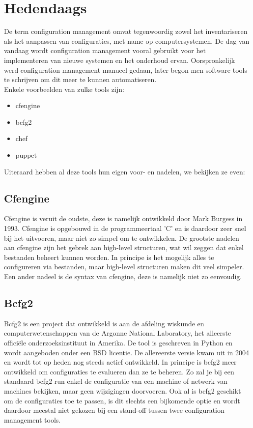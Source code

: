 \section{Hedendaags}
De term configuration management omvat tegenwoordig zowel het inventariseren als het aanpassen van configuraties, met name op computersystemen. De dag van vandaag wordt configuration management vooral gebruikt voor het implementeren van nieuwe systemen en het onderhoud ervan. Oorspronkelijk werd configuration management manueel gedaan, later begon men software tools te schrijven om dit meer te kunnen automatiseren.\\
Enkele voorbeelden van zulke tools zijn:
\begin{itemize}
\item cfengine
\item bcfg2
\item chef
\item puppet
\end{itemize}
Uiteraard hebben al deze tools hun eigen voor- en nadelen, we bekijken ze even:
%
\subsection{Cfengine}
Cfengine is veruit de oudste, deze is namelijk ontwikkeld door Mark Burgess in 1993. Cfengine is opgebouwd in de programmeertaal 'C' en is daardoor zeer snel bij het uitvoeren, maar niet zo simpel om te ontwikkelen. De grootste nadelen aan cfengine zijn het gebrek aan high-level structuren, wat wil zeggen dat enkel bestanden beheert kunnen worden. In principe is het mogelijk alles te configureren via bestanden, maar high-level structuren maken dit veel simpeler. Een ander nadeel is de syntax van cfengine, deze is namelijk niet zo eenvoudig.
%
\subsection{Bcfg2}
Bcfg2 is een project dat ontwikkeld is aan de afdeling wiskunde en computerwetenschappen van de Argonne National Laboratory, het alleerste offici\"ele onderzoeksinstituut in Amerika. De tool is geschreven in Python en wordt aangeboden onder een BSD licentie. De allereerste versie kwam uit in 2004 en wordt tot op heden nog steeds actief ontwikkeld. In principe is bcfg2 meer ontwikkeld om configuraties te evalueren dan ze te beheren. Zo zal je bij een standaard bcfg2 run enkel de configuratie van een machine of netwerk van machines bekijken, maar geen wijzigingen doorvoeren. Ook al is bcfg2 geschikt om de configuraties toe te passen, is dit slechts een bijkomende optie en wordt daardoor meestal niet gekozen bij een stand-off tussen twee configuration management tools.
%
